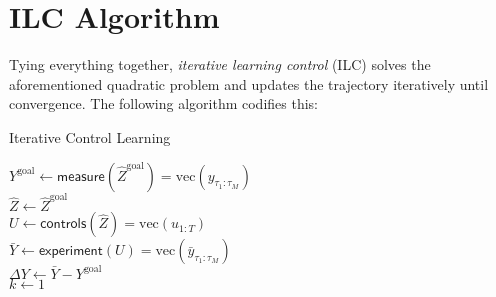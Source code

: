 \documentclass{article}
\begin{document}
\newpage

\section*{ILC Algorithm}

Tying everything together, \textit{iterative learning control} (ILC) solves the aforementioned quadratic problem and updates the trajectory iteratively until convergence.  The following algorithm codifies this: 

\begin{algorithm}
  \caption{Iterative Control Learning}
  $Y^\text{goal} \gets \textsf{measure}(\hat Z^\text{goal}) = \text{vec}(y_{\tau_1:\tau_M})$\\
  $\hat Z \gets \hat Z^\text{goal}$\\
  $U \gets \textsf{controls}(\hat Z) = \text{vec}(u_{1:T})$ \\
  $\bar Y \gets \textsf{experiment}(U) = \text{vec}(\bar y_{\tau_1:\tau_M})$\\
  $\Delta Y \gets \bar Y - Y^\text{goal}$ \\
  $k \gets 1$\\
\end{algorithm}


 
\end{document}
